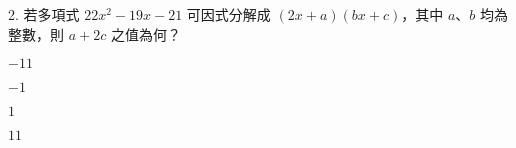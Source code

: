 \documentclass[12pt]{article}
\begin{document}
\begin{problem}
  \item[2.] 若多項式 $22x^2 - 19x - 21$ 可因式分解成 $(2x + a)(bx + c)$，其中 $a$、$b$ 均為整數，則 $a + 2c$ 之值為何？
  \begin{choices}
    \item $-11$
    \item $-1$
    \item $1$
    \item $11$
  \end{choices}
\end{problem}
\end{document}
